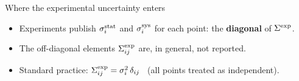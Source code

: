 \documentclass[aspectratio=169,10pt]{beamer}
\newcommand{\Sexp}{\Sigma^{\rm exp}}
\newcommand{\Semu}{\Sigma^{\rm emu}}
\begin{document}
\begin{frame}{Where the experimental uncertainty enters}
\uncover<2->{%
\[
\Delta y = y_{\rm exp}-y_{\rm model}(\boldsymbol{\theta}),
\qquad
\Sigma=\underbrace{\Semu(\boldsymbol{\theta})}_{\text{known: GP emulator}}
+\underbrace{\Sexp}_{\text{\alert{only partly known}}}
\]
}
\vspace{1mm}
\begin{itemize}
  \item<3-> Experiments publish $\sigma_i^{\rm stat}$ and $\sigma_i^{\rm sys}$ for each point: the \textbf{diagonal} of $\Sexp$.
  \item<4-> The off-diagonal elements $\Sexp_{ij}$ are, in general, not reported.
  \item<5-> Standard practice: $\Sexp_{ij}=\sigma_i^2\,\delta_{ij}$ \ (all points treated as independent).
\end{itemize}
\end{frame}
\end{document}
